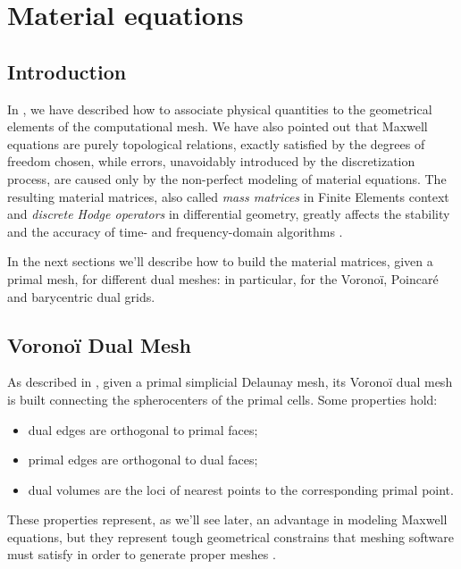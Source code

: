 \chapter{Material equations} \label{cha:material_equations}

\section{Introduction}

In , we have described how to
associate physical quantities to the geometrical elements of the
computational mesh. We have also pointed out that Maxwell equations are
purely topological relations, exactly satisfied by the degrees of
freedom chosen, while errors, unavoidably introduced by the
discretization process, are caused only by the non-perfect modeling of
material equations. The resulting material matrices, also called \emph{mass
matrices} in Finite Elements context and \emph{discrete Hodge
operators} in differential geometry, greatly affects the stability and
the accuracy of time- and frequency-domain algorithms
\cite{schuhmann_whitney,schuhmann_stability}.

In the next sections we'll describe how to build the material
matrices, given a primal mesh, for different dual meshes: in
particular, for the Vorono\"i, Poincar\'e and barycentric dual grids.

\section{Vorono\"i Dual Mesh} \label{sec:voronoi}

As described in , given a primal simplicial Delaunay
mesh, its Vorono\"i dual mesh is built connecting the spherocenters of
the primal cells. Some properties hold:
\begin{itemize}
\item
  dual edges are orthogonal to primal faces;
\item
  primal edges are orthogonal to dual faces;
\item
  dual volumes are the loci of nearest points to the corresponding
  primal point.
\end{itemize}

These properties represent, as we'll see later, an advantage in modeling
Maxwell equations, but they represent tough geometrical
constrains that meshing software must satisfy in order to generate
proper meshes \cite{triangle}.


